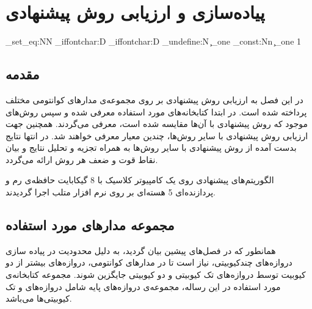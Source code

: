 \chapter{پیاده‌سازی و ارزیابی روش پیشنهادی}
\newpage
\ExplSyntaxOn
\cs_set_eq:NN
\etex_iffontchar:D
\tex_iffontchar:D
\cs_undefine:N \c_one
\int_const:Nn \c_one { 1 }
\ExplSyntaxOff
{}
\section{مقدمه}
در این فصل به ارزیابی روش پیشنهادی بر روی مجموعه‌ی مدارهای کوانتومی مختلف پرداخته شده است. در ابتدا کتابخانه‌های مورد استفاده معرفی شده و سپس روش‌های موجود که روش پیشنهادی با آن‌ها مقایسه شده است، معرفی می‌گردند. همچنین جهت ارزیابی روش پیشنهادی با سایر روش‌ها، چندین معیار معرفی خواهند شد. در انتها نتایج بدست آمده از روش پیشنهادی با سایر روش‌ها به همراه تجزیه و تحلیل نتایج و بیان نقاط قوت و ضعف هر روش ارائه می‌گردد\cite{andreev2006balanced}.

الگوریتم‌های پیشنهادی روی یک کامپیوتر کلاسیک با 8 گیکابایت حافظه‌ی رم و پردازنده‌ای 5 هسته‌ای بر روی نرم افزار متلب اجرا گردیدند.
\section{مجموعه مدارهای مورد استفاده}
همانطور که در فصل‌های پیشین بیان گردید، به دلیل محدودیت در پیاده سازی دروازه‌های چندکیوبیتی، نیاز است تا در مدارهای کوانتومی، دروازه‌های بیشتر از دو کیوبیت توسط دروازه‌های تک کیوبیتی و دو کیوبیتی جایگزین شوند. مجموعه کتابخانه‌ی مورد استفاده در این رساله، مجموعه‌ی دروازه‌های پایه  شامل دروازه‌های  و تک کیوبیتی‌ها می‌باشد.







